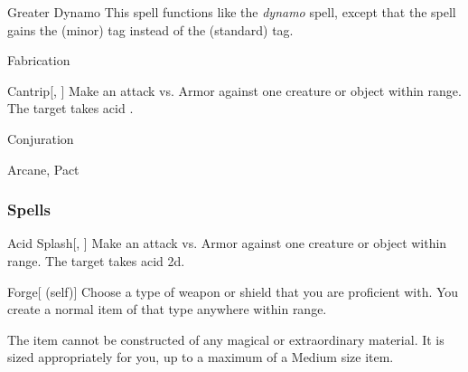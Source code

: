 \lowercase{\hypertarget{spell:Greater Dynamo}{}}\label{spell:Greater Dynamo}
\begin{ability}[\nth{4}]{\hypertarget{spell:Greater Dynamo}{Greater Dynamo}}
This spell functions like the \textit{dynamo} spell, except that the spell gains the  (minor) tag instead of the  (standard) tag.
\end{ability}
\vspace{0.25em}


\newpage
\begin{spellsection}{Fabrication}

\begin{spellheader}
\end{spellheader}


\begin{ability}{Cantrip}[, ]
Make an attack vs. Armor against one creature or object within \rngmed range.
\hit The target takes acid .
\end{ability}




 Conjuration

 Arcane, Pact
\end{spellsection}


\subsubsection{Spells}


\lowercase{\hypertarget{spell:Acid Splash}{}}\label{spell:Acid Splash}
\begin{ability}[\nth{1}]{\hypertarget{spell:Acid Splash}{Acid Splash}}[, ]
Make an attack vs. Armor against one creature or object within \rngmed range.
\hit The target takes acid  \plus2d.
\end{ability}
\vspace{0.25em}



\lowercase{\hypertarget{spell:Forge}{}}\label{spell:Forge}
\begin{ability}[\nth{1}]{\hypertarget{spell:Forge}{Forge}}[ (self)]
Choose a type of weapon or shield that you are proficient with.
You create a normal item of that type anywhere within \rngclose range.

The item cannot be constructed of any magical or extraordinary material.
It is sized appropriately for you, up to a maximum of a Medium size item.
\end{ability}
\vspace{0.25em}



